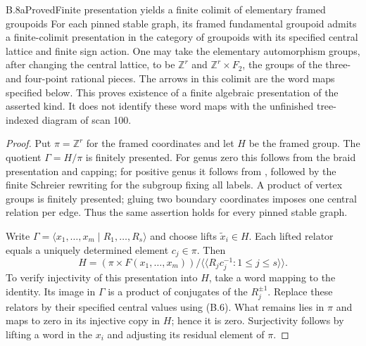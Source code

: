 \begin{result}{B.8a}{Proved}{Finite presentation yields a finite colimit of elementary framed groupoids}
For each pinned stable graph, its framed fundamental groupoid admits
a finite-colimit presentation in the category of groupoids with its
specified central lattice and finite sign action.  One may take the
elementary automorphism groups, after changing the central lattice,
to be $\mathbb Z^r$ and $\mathbb Z^r\times F_2$, the groups of the
three- and four-point rational pieces.  The arrows in this colimit
are the word maps specified below.  This proves existence of a
finite algebraic presentation of the asserted kind.  It does not
identify these word maps with the unfinished tree-indexed diagram
of scan 100.
\end{result}
\begin{proof}
Put $\pi=\mathbb Z^r$ for the framed coordinates and let $H$ be the
framed group.  The quotient $\Gamma=H/\pi$ is finitely presented.
For genus zero this follows from the braid presentation and capping;
for positive genus it follows from
\citet[Theorems 3.1 and 3.2]{B_LabruereParis}, followed by the finite
Schreier rewriting for the subgroup fixing all labels.  A product
of vertex groups is finitely presented; gluing two boundary
coordinates imposes one central relation per edge.  Thus the same
assertion holds for every pinned stable graph.

Write $\Gamma=\langle x_1,\ldots,x_m\mid R_1,\ldots,R_s\rangle$
and choose lifts $\widetilde x_i\in H$.  Each lifted relator equals
a uniquely determined element $c_j\in\pi$.  Then
\[
 H=\left(\pi\times F(x_1,\ldots,x_m)\right)
       /\langle\!\langle R_jc_j^{-1}:1\leq j\leq s\rangle\!\rangle.
 \tag{B.6}
\]
To verify injectivity of this presentation into $H$, take a word
mapping to the identity.  Its image in $\Gamma$ is a product of
conjugates of the $R_j^{\pm1}$.  Replace these relators by their
specified central values using (B.6).  What remains lies in $\pi$
and maps to zero in its injective copy in $H$; hence it is zero.
Surjectivity follows by lifting a word in the $x_i$ and adjusting
its residual element of $\pi$.


\end{proof}
